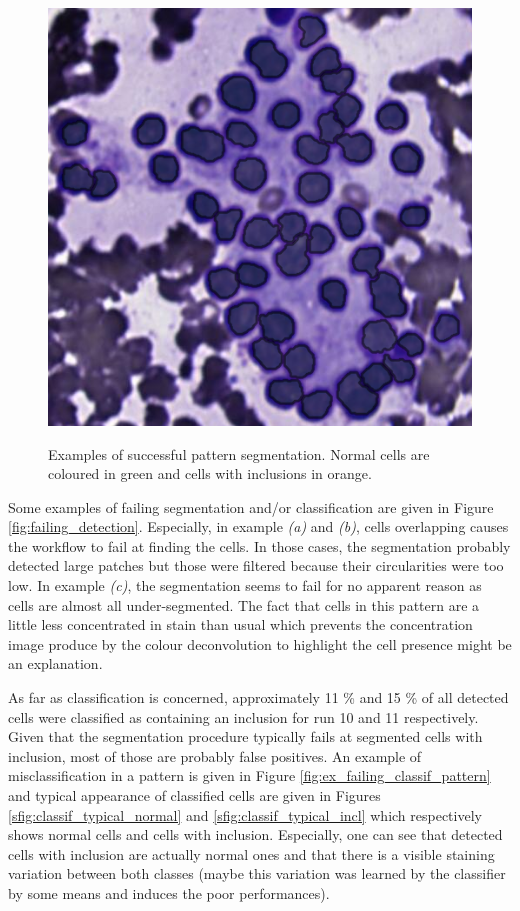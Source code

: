 \begin{figure}
{		\includegraphics[scale=0.5]{image/success_reseg_2_nopat.png}
	}
	\caption{Examples of successful pattern segmentation. Normal cells are coloured in green and cells with inclusions in orange.}
	\label{fig:pattern_success_full_reseg}
\end{figure}

Some examples of failing segmentation and/or classification are given in Figure \ref{fig:failing_detection}. Especially, in example \textit{(a)} and \textit{(b)}, cells overlapping causes the workflow to fail at finding the cells. In those cases, the segmentation probably detected large patches but those were filtered because their circularities were too low. In example \textit{(c)}, the segmentation seems to fail for no apparent reason as cells are almost all under-segmented. The fact that cells in this pattern are a little less concentrated in stain than usual which prevents the concentration image produce by the colour deconvolution to highlight the cell presence might be an explanation. 

As far as classification is concerned, approximately 11 \% and 15 \% of all detected cells were classified as containing an inclusion for run 10 and 11 respectively. Given that the segmentation procedure typically fails at segmented cells with inclusion, most of those are probably false positives. An example of misclassification in a pattern is given in Figure \ref{fig:ex_failing_classif_pattern} and typical appearance of classified cells are given in Figures \ref{sfig:classif_typical_normal} and \ref{sfig:classif_typical_incl} which respectively shows normal cells and cells with inclusion. Especially, one can see that detected cells with inclusion are actually normal ones and that there is a visible staining variation between both classes (maybe this variation was learned by the classifier by some means and induces the poor performances).

